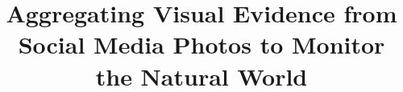 \documentclass{sig-alternate-05-2015}
\begin{document}


\title{Aggregating Visual Evidence from Social Media Photos to Monitor the Natural World}

%
%
%
%
%
\end{document}

